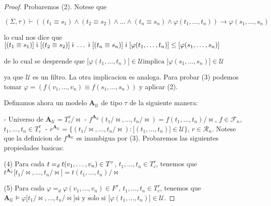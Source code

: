 \begin{proof}
    Probaremos (2). Notese que

    $\displaystyle (\Sigma, \tau)\vdash \left( (t_{1}\equiv s_{1})\wedge (t_{2}\equiv s_{2})\wedge \dotsc\wedge (t_{n}\equiv s_{n})\wedge \varphi (t_{1}, \dotsc, t_{n})\right) \rightarrow \varphi (s_{1}, \dotsc, s_{n}) $

    lo cual nos dice que
    $\displaystyle \lbrack (t_{1}\equiv s_{1})\rbrack \ \IN \ \lbrack(t_{2}\equiv s_{2})\rbrack \ \IN \  \dotsc \ \IN \ \lbrack(t_{n}\equiv s_{n})\rbrack \ \IN \ \lbrack\varphi (t_{1}, \dotsc, t_{n})\rbrack\leq \lbrack \varphi (s_{1}, \dotsc, s_{n})\rbrack $

    de lo cual se desprende que
    $\displaystyle \lbrack \varphi (t_{1}, \dotsc, t_{n})\rbrack\in \mathcal{U}\text{implica }\lbrack\varphi (s_{1}, \dotsc, s_{n})\rbrack\in \mathcal{U} $

    ya que $\mathcal{U}$ es un filtro. La otra implicacion es analoga.
    Para probar (3) podemos tomar $\varphi =\left( f(v_{1}, \dotsc, v_{n})\equiv f(s_{1}, \dotsc, s_{n})\right) $ y aplicar (2).

    Definamos ahora un modelo $\mathbf{A}_{\mathcal{U}}$ de tipo $\tau $ de la siguiente manera:

    - Universo de $\mathbf{A}_{\mathcal{U}}=T_{c}^{\tau }/\mathrm{\bowtie }$
    - $f^{\mathbf{A}_{\mathcal{U}}}(t_{1}/\mathrm{\bowtie }, \dotsc, t_{n}/ \mathrm{\bowtie })=f(t_{1}, \dotsc, t_{n})/\mathrm{\bowtie }$, $f\in \mathcal{F}_{n}$, $t_{1}, \dotsc, t_{n}\in T_{c}^{\tau }\;$
    - $r^{\mathbf{A}_{\mathcal{U}}} = \{(t_{1}/\mathrm{\bowtie }, \dotsc, t_{n}/ \mathrm{\bowtie }):\lbrack(t_{1}, \dotsc, t_{n})\rbrack\in \mathcal{U}\}$, $r\in \mathcal{R}_{n}.$
    Notese que la definicion de $f^{\mathbf{A}_{\mathcal{U}}}$ es inambigua por (3). Probaremos las siguientes propiedades basicas:

    (4) Para cada $t=_{d}t(v_{1}, \dotsc, v_{n}) \in T^{\tau}$, $ t_{1}, \dotsc, t_{n}\in T_{c}^{\tau }$, tenemos que
    $\displaystyle t^{\mathbf{A}_{\mathcal{U}}}\lbrack t_{1}/\mathrm{\bowtie }, \dotsc, t_{n}/\mathrm{\bowtie }\rbrack=t(t_{1}, \dotsc, t_{n})/\mathrm{\bowtie } $

    (5) Para cada $\varphi =_{d}\varphi (v_{1}, \dotsc, v_{n}) \in F^{\tau }$, $ t_{1}, \dotsc, t_{n}\in T_{c}^{\tau }$, tenemos que
    $\displaystyle \mathbf{A}_{\mathcal{U}}\models \varphi \lbrack t_{1}/\mathrm{\bowtie } , \dotsc, t_{n}/\mathrm{\bowtie }\rbrack\text{si y solo si }\lbrack\varphi (t_{1}, \dotsc, t_{n})\rbrack\in \mathcal{U}. $


\end{proof}
